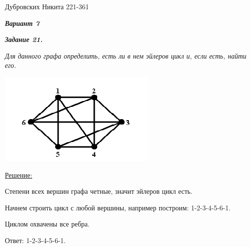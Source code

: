 \documentclass[12pt]{article}
\begin{document}
Дубровских Никита 221-361

\textit{\textbf{Вариант 7}}

\textit{\textbf{Задание 21.}}

\textit{Для данного графа определить, есть ли в нем эйлеров цикл и, если
есть, найти его.}

\begin{center}
\includegraphics{21.png}
\end{center}

\underline{Решение:}

Степени всех вершин графа четные, значит эйлеров цикл есть.

Начнем строить цикл с любой вершины, например построим: 1-2-3-4-5-6-1.

Циклом охвачены все ребра.

Ответ: 1-2-3-4-5-6-1.
\end{document}
